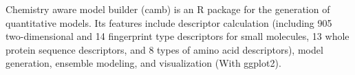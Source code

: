Chemistry aware model builder (camb) is an R package for the generation of quantitative models. Its features include descriptor calculation (including 905 two-dimensional and 14 fingerprint type descriptors for small molecules, 13 whole protein sequence descriptors, and 8 types of amino acid descriptors), model generation, ensemble modeling, and visualization (With ggplot2).
